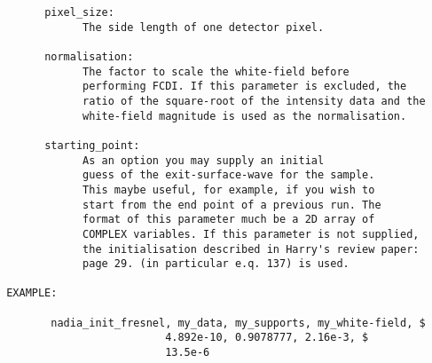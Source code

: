 \begin{verbatim}
       pixel_size:
             The side length of one detector pixel.

       normalisation: 
             The factor to scale the white-field before
             performing FCDI. If this parameter is excluded, the
             ratio of the square-root of the intensity data and the
             white-field magnitude is used as the normalisation.

       starting_point: 
             As an option you may supply an initial 
             guess of the exit-surface-wave for the sample. 
             This maybe useful, for example, if you wish to 
             start from the end point of a previous run. The
             format of this parameter much be a 2D array of
             COMPLEX variables. If this parameter is not supplied,
             the initialisation described in Harry's review paper: 
             page 29. (in particular e.q. 137) is used.

 EXAMPLE:

        nadia_init_fresnel, my_data, my_supports, my_white-field, $
                          4.892e-10, 0.9078777, 2.16e-3, $
                          13.5e-6

\end{verbatim}

